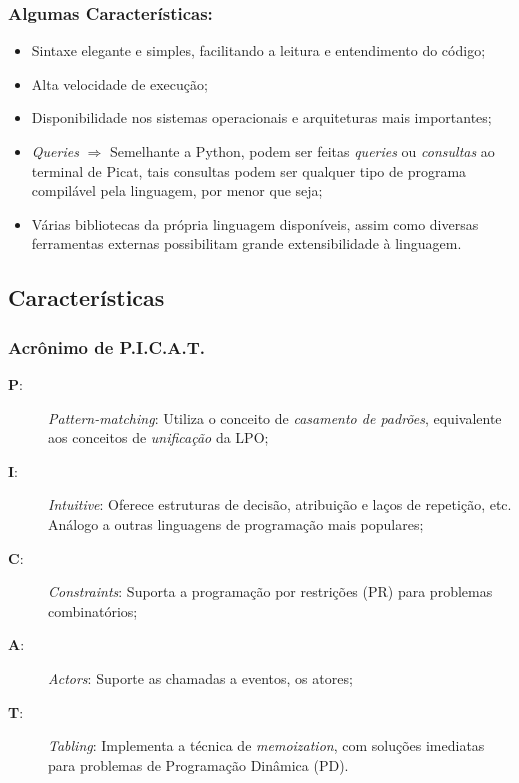\begin{frame}
    \frametitle{Algumas Características:}

    \begin{itemize}
    
      \item Sintaxe elegante e simples, facilitando a leitura e entendimento do código;
      
      \item Alta velocidade de execução;
      
      \item Disponibilidade nos sistemas operacionais e arquiteturas mais importantes;
      
      \item \textit{Queries} $\Rightarrow$ Semelhante a Python, podem ser feitas \textit{queries}
      ou \textit{consultas} ao terminal de Picat, tais consultas podem ser qualquer tipo de 
      programa compilável pela linguagem, por menor que seja;
      
      \item Várias bibliotecas da própria linguagem disponíveis, assim como diversas ferramentas
      externas possibilitam grande extensibilidade à linguagem.
      
      
    \end{itemize}
\end{frame}


\subsection{Características}
\begin{frame}			  
    \frametitle{Acrônimo de \textbf{P.I.C.A.T.}}
  
  	\begin{description}
   
 
      \item [\textbf{P}:] \textit{Pattern-matching}:  Utiliza o conceito de \textit{casamento de 
      padrões}, equivalente aos conceitos de \textit{unificação} da LPO;

      \item [\textbf{I}:] \textit{Intuitive}: Oferece estruturas de decisão, atribuição e laços de
      repetição, etc. Análogo a outras linguagens de programação mais populares;

      \item [\textbf{C}:] \textit{Constraints}: Suporta a programação por restrições (PR) para 	
      problemas combinatórios;

       \item [\textbf{A}:] \textit{Actors}: Suporte as chamadas a eventos, os atores;

      \item [\textbf{T}:] \textit{Tabling}: Implementa a técnica de \textit{memoization}, com 
      soluções imediatas para problemas de Programação Dinâmica (PD).
   
  
  \end{description}	
\end{frame}

